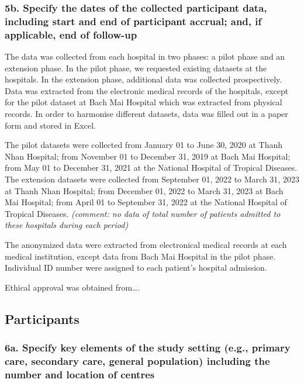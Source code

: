 \documentclass[
  letterpaper,
  DIV=11,
  numbers=noendperiod]{scrartcl}
\begin{document}
\subsubsection{5b. Specify the dates of the collected participant data,
including start and end of participant accrual; and, if applicable, end
of
follow-up}\label{b.-specify-the-dates-of-the-collected-participant-data-including-start-and-end-of-participant-accrual-and-if-applicable-end-of-follow-up}

The data was collected from each hospital in two phases: a pilot phase
and an extension phase. In the pilot phase, we requested existing
datasets at the hospitals. In the extension phase, additional data was
collected prospectively. Data was extracted from the electronic medical
records of the hospitals, except for the pilot dataset at Bach Mai
Hospital which was extracted from physical records. In order to
harmonise different datasets, data was filled out in a paper form and
stored in Excel.

The pilot datasets were collected from January 01 to June 30, 2020 at
Thanh Nhan Hospital; from November 01 to December 31, 2019 at Bach Mai
Hospital; from May 01 to December 31, 2021 at the National Hospital of
Tropical Diseases. The extension datasets were collected from September
01, 2022 to March 31, 2023 at Thanh Nhan Hospital; from December 01,
2022 to March 31, 2023 at Bach Mai Hospital; from April 01 to September
31, 2022 at the National Hospital of Tropical Diseases. \emph{(comment:
no data of total number of patients admitted to these hospitals during
each period)}

The anonymized data were extracted from electronical medical records at
each medical institution, except data from Bach Mai Hospital in the
pilot phase. Individual ID number were assigned to each patient's
hospital admission.

Ethical approval was obtained from\ldots.

\subsection{Participants}\label{participants}

\subsubsection{6a. Specify key elements of the study setting (e.g.,
primary care, secondary care, general population) including the number
and location of
centres}\label{a.-specify-key-elements-of-the-study-setting-e.g.-primary-care-secondary-care-general-population-including-the-number-and-location-of-centres}
\end{document}
